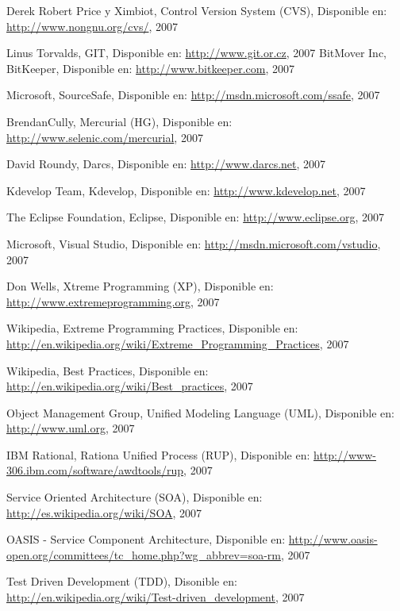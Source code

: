 \begin{thebibliography}{99}
 Derek Robert Price y Ximbiot, Control Version System (CVS), Disponible en:
	\url{http://www.nongnu.org/cvs/}, 2007

 Linus Torvalds, GIT, Disponible en:
	\url{http://www.git.or.cz}, 2007
 BitMover Inc, BitKeeper, Disponible en:
	\url{http://www.bitkeeper.com}, 2007

 Microsoft, SourceSafe, Disponible en:
	\url{http://msdn.microsoft.com/ssafe}, 2007

 BrendanCully, Mercurial (HG), Disponible en:
	\url{http://www.selenic.com/mercurial}, 2007

 David Roundy, Darcs, Disponible en:
	\url{http://www.darcs.net}, 2007

 Kdevelop Team, Kdevelop, Disponible en:
	\url{http://www.kdevelop.net}, 2007

 The Eclipse Foundation, Eclipse, Disponible en:
	\url{http://www.eclipse.org}, 2007

 Microsoft, Visual Studio, Disponible en:
	\url{http://msdn.microsoft.com/vstudio}, 2007

 Don Wells, Xtreme Programming (XP), Disponible en:
	\url{http://www.extremeprogramming.org}, 2007

 Wikipedia, Extreme Programming Practices, Disponible en:
	\url{http://en.wikipedia.org/wiki/Extreme_Programming_Practices}, 2007

 Wikipedia, Best Practices, Disponible en:
	\url{http://en.wikipedia.org/wiki/Best_practices}, 2007

 Object Management Group, Unified Modeling Language (UML), Disponible en:
	\url{http://www.uml.org}, 2007

 IBM Rational, Rationa Unified Process (RUP), Disponible en:
	\url{http://www-306.ibm.com/software/awdtools/rup}, 2007

 Service Oriented Architecture (SOA), Disponible en:
	\url{http://es.wikipedia.org/wiki/SOA}, 2007

 OASIS - Service Component Architecture, Disponible en:
	\url{http://www.oasis-open.org/committees/tc_home.php?wg_abbrev=soa-rm}, 2007

 Test Driven Development (TDD), Disonible en:
	\url{http://en.wikipedia.org/wiki/Test-driven_development}, 2007


\end{thebibliography}

